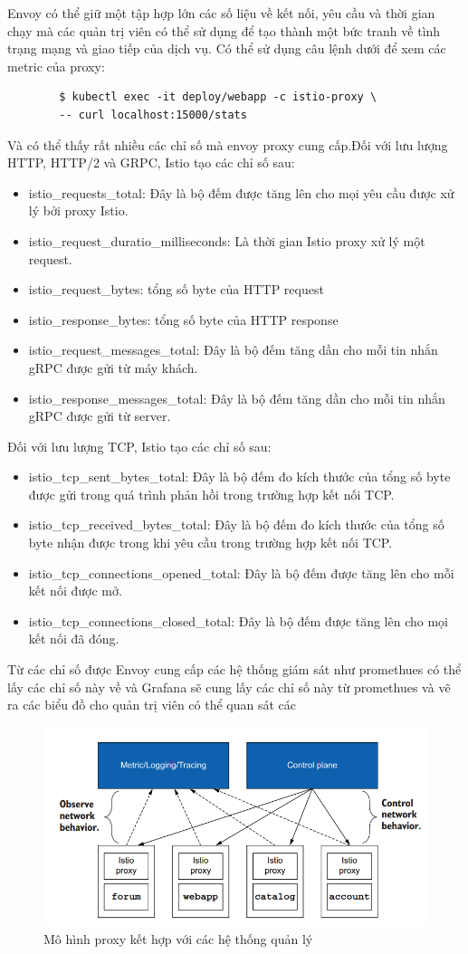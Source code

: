 \documentclass[12pt,a4paper]{report}
\begin{document}
{{	Envoy có thể giữ một tập hợp lớn các số liệu về kết nối, yêu cầu và thời gian chạy mà các quản trị viên có thể sử dụng để tạo thành một bức tranh về tình trạng mạng và giao tiếp của dịch vụ. Có thể sử dụng câu lệnh dưới để xem các metric của proxy:
	\begin{lstlisting}
		$ kubectl exec -it deploy/webapp -c istio-proxy \
		-- curl localhost:15000/stats
	\end{lstlisting}
	Và có thể thấy rất nhiều các chỉ số mà envoy proxy cung cấp.Đối với lưu lượng HTTP, HTTP/2 và GRPC, Istio tạo các chỉ số sau:
	\begin{itemize}				
		\item istio\_requests\_total: Đây là bộ đếm được tăng lên cho mọi yêu cầu được xử lý bởi proxy Istio.
		\item istio\_request\_duratio\_milliseconds: Là thời gian Istio proxy xử lý một request.
		\item  istio\_request\_bytes: tổng số byte của HTTP request
		\item  istio\_response\_bytes: tổng số byte của HTTP response
		\item  istio\_request\_messages\_total: Đây là bộ đếm tăng dần cho mỗi tin nhắn gRPC được gửi từ máy khách.
		\item istio\_response\_messages\_total: Đây là bộ đếm tăng dần cho mỗi tin nhắn gRPC được gửi từ server.
	\end{itemize}
	Đối với lưu lượng TCP, Istio tạo các chỉ số sau:
	\begin{itemize}				
		\item istio\_tcp\_sent\_bytes\_total: Đây là bộ đếm đo kích thước của tổng số byte được gửi trong quá trình phản hồi trong trường hợp kết nối TCP.
		\item istio\_tcp\_received\_bytes\_total: Đây là bộ đếm đo kích thước của tổng số byte nhận được trong khi yêu cầu trong trường hợp kết nối TCP.
		\item istio\_tcp\_connections\_opened\_total: Đây là bộ đếm được tăng lên cho mỗi kết nối được mở.
		\item istio\_tcp\_connections\_closed\_total: Đây là bộ đếm được tăng lên cho mọi kết nối đã đóng.
	\end{itemize}
	Từ các chỉ số được Envoy cung cấp các hệ thống giám sát như promethues có thể lấy các chỉ số này về và Grafana sẽ cung lấy các chỉ số này từ promethues và vẽ ra các biểu đồ cho quản trị viên có thể quan sát các 
	
	\begin{figure}[h]
		\centering
		\includegraphics[width=0.5\linewidth]{Pics/2.3.1-p1}
		\caption{Mô hình proxy kết hợp với các hệ thống quản lý}
		\label{fig:2}
	

\end{figure}}}
\end{document}
